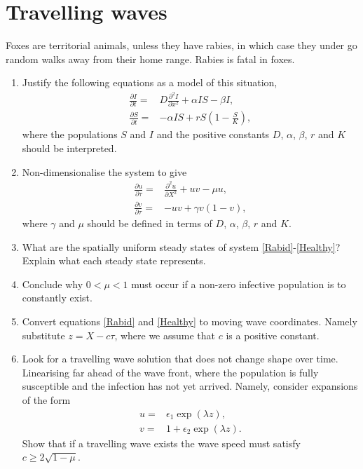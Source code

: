 \documentclass[10pt]{article}
\newcommand{\D}[2]{\frac{\partial #1}{\partial #2}}
\newcommand{\DD}[2]{\frac{\partial^2 #1}{\partial #2^2}}
\newcommand{\eqns}[2]{equations \eqref{#1} and \eqref{#2}}
\renewcommand{\l}{\left(}
\renewcommand{\r}{\right)}
\begin{document}
\section{Travelling waves}
Foxes are territorial animals, unless they have rabies, in which case they under go random walks away from their home range. Rabies is fatal in foxes.
\begin{enumerate}
\item Justify the following equations as a model of this situation,
\begin{align}
\D{I}{t}=&D\DD{I}{x}+\alpha IS-\beta I,\\
\D{S}{t}=&-\alpha IS+rS\l 1-\frac{S}{K}\r,
\end{align}
where the populations $S$ and $I$ and the positive constants $D$, $\alpha$, $\beta$, $r$ and $K$ should be interpreted.

\item Non-dimensionalise the system to give
\begin{align}
\D{u}{\tau}=&\DD{u}{X}+uv-\mu u,\label{Rabid}\\
\D{v}{\tau}=&-uv+\gamma v\l 1-v\r\label{Healthy},
\end{align}
where $\gamma$ and $\mu$ should be defined in terms of $D$, $\alpha$, $\beta$, $r$ and $K$.

\item What are the spatially uniform steady states of system \eqref{Rabid}-\eqref{Healthy}? Explain what each steady state represents.

\item Conclude why $0<\mu<1$ must occur if a non-zero infective population is to constantly exist.

\item Convert \eqns{Rabid}{Healthy} to moving wave coordinates. Namely substitute $z=X-c\tau$, where we assume that $c$ is a positive constant. 

\item Look for a travelling wave solution that does not change shape over time.  Linearising far ahead of the wave front, where the population is fully susceptible and the infection has not yet arrived. Namely, consider expansions of the form
\begin{align}
u=&\epsilon_1\exp(\lambda z),\label{Expansionu}\\ 
v=&1+\epsilon_2\exp(\lambda z).\label{Expansionv}
\end{align}
Show that if a travelling wave exists the wave speed must satisfy $c\geq 2 \sqrt{1-\mu}$.
\end{enumerate}
\end{document}
